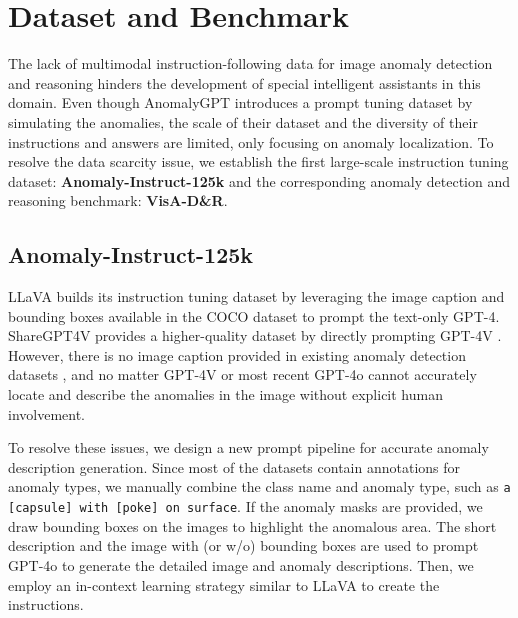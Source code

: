 
\section{Dataset and Benchmark}
The lack of multimodal instruction-following data for image anomaly detection and reasoning hinders the development of special intelligent assistants in this domain. Even though AnomalyGPT \cite{gu2024anomalygpt} introduces a prompt tuning dataset by simulating the anomalies, the scale of their dataset and the diversity of their instructions and answers are limited, only focusing on anomaly localization. To resolve the data scarcity issue, we establish the first large-scale instruction tuning dataset: \textbf{Anomaly-Instruct-125k} and the corresponding anomaly detection and reasoning benchmark: \textbf{VisA-D\&R}.

\subsection{Anomaly-Instruct-125k}
LLaVA \cite{llava} builds its instruction tuning dataset by leveraging the image caption and bounding boxes available in the COCO dataset\cite{coco} to prompt the text-only GPT-4. ShareGPT4V \cite{sharegpt4v} provides a higher-quality dataset by directly prompting GPT-4V \cite{gpt-api-4vision}. However, there is no image caption provided in existing anomaly detection datasets \cite{mvtec, bmad}, and no matter GPT-4V \cite{gpt-api-4vision} or most recent GPT-4o  \cite{gpt-api-4o} cannot accurately locate and describe the anomalies in the image without explicit human involvement. 

To resolve these issues, we design a new prompt pipeline for accurate anomaly description generation. Since most of the datasets contain annotations for anomaly types, we manually combine the class name and anomaly type, such as \texttt{a [capsule] with [poke] on surface}. If the anomaly masks are provided, we draw bounding boxes on the images to highlight the anomalous area. The short description and the image with (or w/o) bounding boxes are used to prompt GPT-4o to generate the detailed image and anomaly descriptions. Then, we employ an in-context learning strategy similar to LLaVA to create the instructions.

